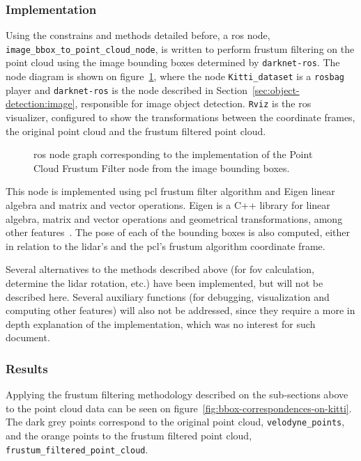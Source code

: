 \subsubsection{Implementation}
Using the constrains and methods detailed before, a \ac{ros} node, \texttt{image\_bbox\_to\_point\_cloud\_node}, is written to perform frustum filtering on the point cloud using the image bounding boxes determined by \texttt{darknet-ros}. The node diagram is shown on figure~\ref{fig:ros-graph-frustum}, where the node \texttt{Kitti\_dataset} is a \texttt{rosbag} player and \texttt{darknet-ros} is the node described in Section~\ref{sec:object-detection:image}, responsible for image object detection. \texttt{Rviz} is the \ac{ros} visualizer, configured to show the transformations between the coordinate frames, the original point cloud and the frustum filtered point cloud.

\begin{figure}[t]
	\centering
	\def\svgwidth{\columnwidth}
	\graphicspath{{img/image-object-to-point-cloud/}}
	
	\caption{\ac{ros} node graph corresponding to the implementation of the Point Cloud Frustum Filter node from the image bounding boxes.}
	\label{fig:ros-graph-frustum}
\end{figure}


This node is implemented using \ac{pcl} frustum filter algorithm and Eigen linear algebra and matrix and vector operations. Eigen is a C++ library for linear algebra, matrix and vector operations and geometrical transformations, among other features~\cite{Eigenv3}. The pose of each of the bounding boxes is also computed, either in relation to the \ac{lidar}'s and the \ac{pcl}'s frustum algorithm coordinate frame. 

Several alternatives to the methods described above (for \ac{fov} calculation, determine the \ac{lidar} rotation, etc.) have been implemented, but will not be described here. Several auxiliary functions (for debugging, visualization and computing other features) will also not be addressed, since they require a more in depth explanation of the implementation, which was no interest for such document. 


\subsubsection{Results}
Applying the frustum filtering methodology described on the sub-sections above to the point cloud data can be seen on figure~\ref{fig:bbox-correspondences-on-kitti}. The dark grey points correspond to the original point cloud, \texttt{velodyne\_points}, and the orange points to the frustum filtered point cloud, \texttt{frustum\_filtered\_point\_cloud}.

